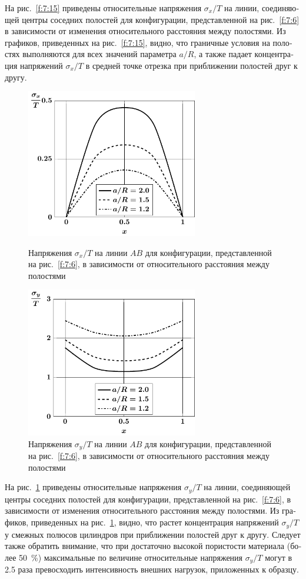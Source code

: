 \begin{russian}
На рис.~\ref{f:7:15} приведены относительные напряжения $\sigma_x/T$ на линии, соединяющей центры соседних полостей для конфигурации, представленной на рис.~\ref{f:7:6} в зависимости от изменения относительного расстояния между полостями. Из графиков, приведенных на рис.~\ref{f:7:15}, видно, что граничные условия на полостях выполняются для всех значений параметра $a/R$, а также падает концентрация напряжений $\sigma_x/T$ в средней точке отрезка при приближении полостей друг к другу.

\begin{figure}[h!]
\centering\footnotesize
\parbox[b]{7.5cm}{\centering\includegraphics[width=7.5cm]{cav4_sig-x.pdf}
\caption{Напряжения $\sigma_x/T$ на линии $AB$ для конфигурации, представленной на рис.~\ref{f:7:6}, в зависимости от относительного расстояния между полостями
\label{f:7:15}}}\hfil\hfil
\parbox[b]{7.5cm}{\centering\includegraphics[width=7.5cm]{cav4_sig-y.pdf}
\caption{Напряжения $\sigma_y/T$ на линии $AB$ для конфигурации, представленной на рис.~\ref{f:7:6}, в зависимости от относительного расстояния между полостями
\label{f:7:16}}}
\end{figure}

На рис.~\ref{f:7:16} приведены относительные напряжения $\sigma_y/T$ на линии, соединяющей центры соседних полостей для конфигурации, представленной на рис.~\ref{f:7:6}, в зависимости от изменения относительного расстояния между полостями. Из графиков, приведенных на рис.~\ref{f:7:16}, видно, что растет концентрация напряжений $\sigma_y/T$ у смежных полюсов цилиндров при приближении полостей друг к другу. Следует также обратить внимание, что при достаточно высокой пористости материала (более 50~\%) максимальные по величине относительные напряжения $\sigma_y/T$ могут в 2.5 раза превосходить интенсивность внешних нагрузок, приложенных к образцу.


\end{russian}
